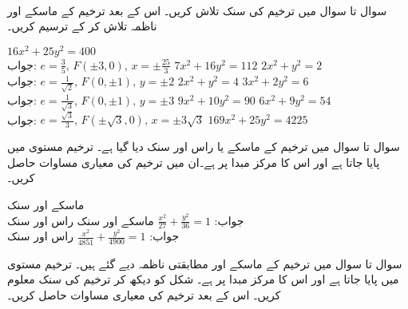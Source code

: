 \\
سوال  تا سوال  میں ترخیم کی سنک تلاش کریں۔ اس کے بعد ترخیم کے ماسکے اور ناظمہ تلاش کر کے ترسیم کریں۔

$16x^2+25y^2=400$\\
جواب:\quad
$e=\tfrac{3}{5},\, F(\pm 3,0),\, x=\pm\tfrac{25}{3}$
$7x^2+16y^2=112$
$2x^2+y^2=2$\\
جواب:\quad
$e=\tfrac{1}{\sqrt{2}},\, F(0,\pm 1),\, y=\pm 2$
$2x^2+y^2=4$
$3x^2+2y^2=6$\\
جواب:\quad
$e=\tfrac{1}{\sqrt{3}},\, F(0,\pm 1),\,y=\pm 3$
$9x^2+10y^2=90$
$6x^2+9y^2=54$\\
جواب:\quad
$e=\tfrac{\sqrt{3}}{3},\, F(\pm \sqrt{3},0),\, x=\pm3\sqrt{3}$
$169x^2+25y^2=4225$

سوال  تا سوال  میں ترخیم کے ماسکے یا راس اور سنک دیا گیا ہے۔ ترخیم  مستوی میں پایا جاتا ہے اور اس کا  مرکز مبدا پر ہے۔ان میں ترخیم کی معیاری مساوات حاصل کریں۔

ماسکے  اور سنک \\
جواب:\quad
$\tfrac{x^2}{27}+\tfrac{y^2}{36}=1$
ماسکے  اور سنک 
راس  اور سنک \\
جواب:\quad
$\tfrac{x^2}{4851}+\tfrac{y^2}{4900}=1$
راس  اور سنک 

سوال  تا سوال  میں ترخیم کے ماسکے اور مطابقتی ناظمہ دیے گئے ہیں۔ ترخیم  مستوی میں پایا جاتا ہے اور اس کا مرکز مبدا پر ہے۔ شکل  کو دیکھ کر ترخیم کی سنک معلوم کریں۔ اس کے بعد ترخیم کی معیاری مساوات حاصل کریں۔

